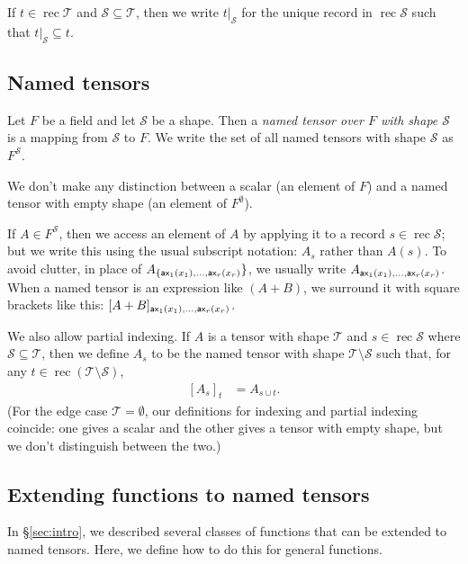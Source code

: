 \documentclass{article}
\DeclareMathOperator{\rec}{rec}
\newcommand{\restrict}[2]{\left.#1\right|_{#2}}
\begin{document}
If $t \in \rec \mathcal{T}$ and $\mathcal{S} \subseteq \mathcal{T}$, then we write $\restrict{t}{\mathcal{S}}$ for the unique record in $\rec \mathcal{S}$ such that $\restrict{t}{\mathcal{S}} \subseteq t$.

\subsection{Named tensors}

Let $F$ be a field and let $\mathcal{S}$ be a shape. Then a \emph{named tensor over $F$ with shape $\mathcal{S}$} is a mapping from $\mathcal{S}$ to $F$. We write the set of all named tensors with shape $\mathcal{S}$ as $F^{\mathcal{S}}$.

We don't make any distinction between a scalar (an element of $F$) and a named tensor with empty shape (an element of $F^\emptyset$).

If $A \in F^{\mathcal{S}}$, then we access an element of $A$ by applying it to a record $s \in \rec \mathcal{S}$; but we write this using the usual subscript notation: $A_s$ rather than $A(s)$. To avoid clutter, in place of $A_{\{\mathsf{ax_\text{$1$}}(x_1), \ldots, \mathsf{ax_\text{$r$}}(x_r)}\}$, we usually write $A_{\mathsf{ax_\text{$1$}}(x_1), \ldots, \mathsf{ax_\text{$r$}}(x_r)}$. When a named tensor is an expression like $(A+B)$, we surround it with square brackets like this: $[A+B]_{\mathsf{ax_\text{$1$}}(x_1), \ldots, \mathsf{ax_\text{$r$}}(x_r)}$.

We also allow partial indexing. If $A$ is a tensor with shape $\mathcal{T}$ and $s \in \rec \mathcal{S}$ where $\mathcal{S} \subseteq \mathcal{T}$, then we define $A_s$ to be the named tensor with shape $\mathcal{T} \setminus \mathcal{S}$ such that, for any $t \in \rec (\mathcal{T} \setminus \mathcal{S})$,
\begin{align*}
\left[A_s\right]_t &= A_{s \cup t}.
\end{align*}
(For the edge case $\mathcal{T} = \emptyset$, our definitions for indexing and partial indexing coincide: one gives a scalar and the other gives a tensor with empty shape, but we don't distinguish between the two.)

\subsection{Extending functions to named tensors}
\label{sec:tensorfunctions}

In \S\ref{sec:intro}, we described several classes of functions that can be extended to named tensors. Here, we define how to do this for general functions.
\end{document}
